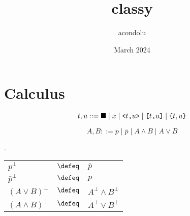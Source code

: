 \documentclass{article}
\title{classy}
\author{acondolu}
\date{March 2024}
\begin{document}
\maketitle

\section{Calculus}

\begin{definition}[Terms]
\[ t, u ::= \blacksquare \mid x \mid \mbox{\normalfont\texttt{<}} t \mbox{\normalfont\texttt{,}} u\mbox{\normalfont\texttt{>}} \mid \mbox{\normalfont\texttt{[}}t \mbox{\normalfont\texttt{,}} u\mbox{\normalfont\texttt{]}} \mid \mbox{\normalfont\texttt{\{}}t, u\mbox{\normalfont\texttt{\}}}\]
\end{definition}

\begin{definition}[Types]
\[ A, B ::= p \mid \bar p \mid A \wedge B \mid A \vee B \]
\end{definition}

\begin{definition}.

\bgroup
\def\arraystretch{1.3}
\begin{tabular}{l c l}
   $p^\bot$ & $\defeq$ & $\bar p$ \\
   ${\bar p}^\bot$ & $\defeq$ & $p$ \\
   $(A \vee B)^\bot$ & $\defeq$ & $A^\bot \wedge B^\bot$ \\
   $(A \wedge B)^\bot$ & $\defeq$ & $A^\bot \vee B^\bot$ \\
\end{tabular}\egroup
    
\end{definition}
\end{document}
